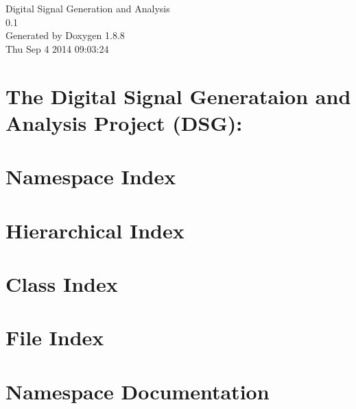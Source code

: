 \documentclass[twoside]{book}
\newcommand{\+}{\discretionary{\mbox{\scriptsize$\hookleftarrow$}}{}{}}
\newcommand{\clearemptydoublepage}{%
  \newpage{\pagestyle{empty}\cleardoublepage}%
}
\begin{document}
\hypersetup{pageanchor=false,
             bookmarks=true,
             bookmarksnumbered=true,
             pdfencoding=unicode
            }
\begin{titlepage}
\vspace*{7cm}
\begin{center}%
{\Large Digital Signal Generation and Analysis \\[1ex]\large 0.\+1 }\\
\vspace*{1cm}
{\large Generated by Doxygen 1.8.8}\\
\vspace*{0.5cm}
{\small Thu Sep 4 2014 09:03:24}\\
\end{center}
\end{titlepage}
\clearemptydoublepage
\tableofcontents
\clearemptydoublepage
{}
\hypersetup{pageanchor=true}

\chapter{The Digital Signal Generataion and Analysis Project (D\+S\+G)\+:}
\label{index}\hypertarget{index}{}
\chapter{Namespace Index}

\chapter{Hierarchical Index}

\chapter{Class Index}

\chapter{File Index}

\chapter{Namespace Documentation}







\end{document}
